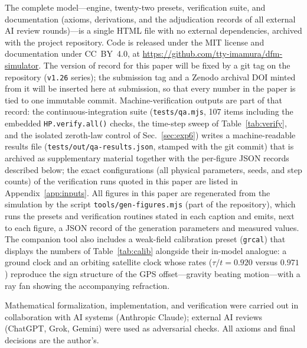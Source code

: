 \documentclass[aps,reprint,amsmath,amssymb,nofootinbib,superscriptaddress,floatfix]{revtex4-2}
\begin{document}
The complete model---engine, twenty-two presets, verification suite,
and documentation (axioms, derivations, and the adjudication records
of all external AI review rounds)---is a single HTML file with no
external dependencies, archived with the project repository.
Code is released under the MIT license and documentation under
CC~BY~4.0, at \url{https://github.com/tty-imamura/dfm-simulator}.
The version of record for this paper will be fixed by a git tag on the
repository (\texttt{v1.26} series); the submission tag and a Zenodo
archival DOI minted from it will be inserted here at submission, so
that every number in the paper is tied to one immutable commit.
Machine-verification outputs are part of that record: the
continuous-integration suite (\texttt{tests/qa.mjs}, 107 items
including the embedded \texttt{HP.verify.all()} checks, the time-step
sweep of Table~\ref{tab:verify}, and the isolated zeroth-law control
of Sec.~\ref{sec:exp6}) writes a machine-readable results file
(\texttt{tests/out/qa-results.json}, stamped with the git commit) that
is archived as supplementary material together with the per-figure
JSON records described below; the exact configurations (all physical
parameters, seeds, and step counts) of the verification runs quoted in
this paper are listed in Appendix~\ref{app:inputs}.
All figures in this paper are regenerated from the simulation by the
script \texttt{tools/gen-figures.mjs} (part of the repository), which
runs the presets and verification routines stated in each caption and
emits, next to each figure, a JSON record of the generation parameters
and measured values.
The companion tool also includes a weak-field calibration preset
(\texttt{grcal}) that displays the numbers of Table~\ref{tab:calib}
alongside their in-model analogue: a ground clock and an orbiting
satellite clock whose rates ($\tau/t = 0.920$ versus $0.971$)
reproduce the sign structure of the GPS offset---gravity beating
motion---with a ray fan showing the accompanying refraction.

\begin{acknowledgments}
Mathematical formalization, implementation, and verification were
carried out in collaboration with AI systems (Anthropic Claude);
external AI reviews (ChatGPT, Grok, Gemini) were used as adversarial
checks. All axioms and final decisions are the author's.
\end{acknowledgments}

\appendix
\end{document}
